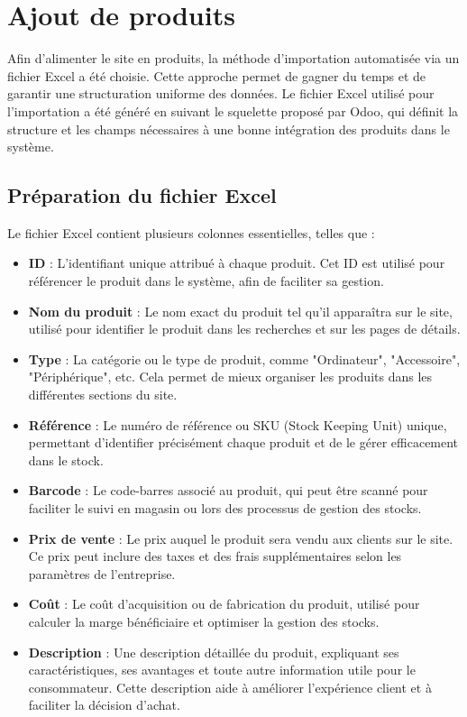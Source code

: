 \documentclass[12pt]{report}
\begin{document}
\section{Ajout de produits}

Afin d'alimenter le site en produits, la méthode d'importation automatisée via un fichier Excel a été choisie. Cette approche permet de gagner du temps et de garantir une structuration uniforme des données. Le fichier Excel utilisé pour l'importation a été généré en suivant le squelette proposé par Odoo, qui définit la structure et les champs nécessaires à une bonne intégration des produits dans le système.

\subsection{Préparation du fichier Excel}

Le fichier Excel contient plusieurs colonnes essentielles, telles que :
\begin{itemize}
    \item \textbf{ID} : L'identifiant unique attribué à chaque produit. Cet ID est utilisé pour référencer le produit dans le système, afin de faciliter sa gestion.
    \item \textbf{Nom du produit} : Le nom exact du produit tel qu'il apparaîtra sur le site, utilisé pour identifier le produit dans les recherches et sur les pages de détails.
    \item \textbf{Type} : La catégorie ou le type de produit, comme "Ordinateur", "Accessoire", "Périphérique", etc. Cela permet de mieux organiser les produits dans les différentes sections du site.
    \item \textbf{Référence} : Le numéro de référence ou SKU (Stock Keeping Unit) unique, permettant d'identifier précisément chaque produit et de le gérer efficacement dans le stock.
    \item \textbf{Barcode} : Le code-barres associé au produit, qui peut être scanné pour faciliter le suivi en magasin ou lors des processus de gestion des stocks.
    \item \textbf{Prix de vente} : Le prix auquel le produit sera vendu aux clients sur le site. Ce prix peut inclure des taxes et des frais supplémentaires selon les paramètres de l'entreprise.
    \item \textbf{Coût} : Le coût d'acquisition ou de fabrication du produit, utilisé pour calculer la marge bénéficiaire et optimiser la gestion des stocks.
    \item \textbf{Description} : Une description détaillée du produit, expliquant ses caractéristiques, ses avantages et toute autre information utile pour le consommateur. Cette description aide à améliorer l'expérience client et à faciliter la décision d'achat.
\end{itemize}
\end{document}

